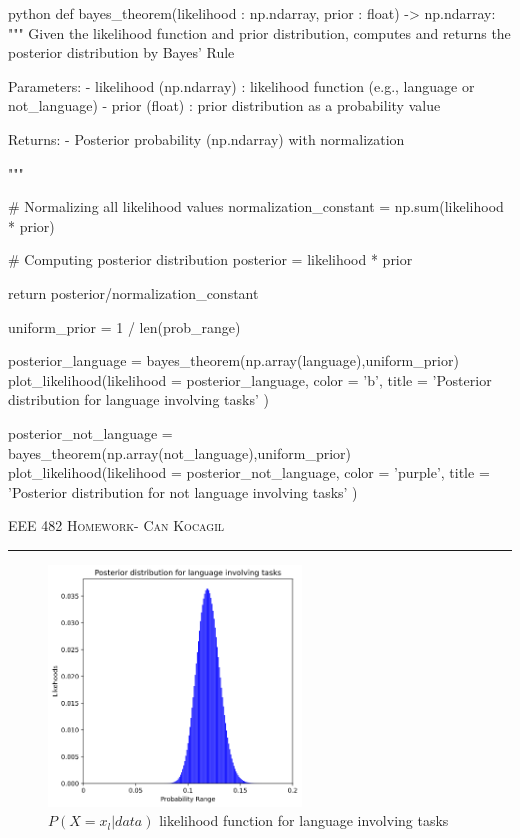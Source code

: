 \documentclass[12pt]{amsart}
\begin{document}
 \begin{mintedbox}{python}
def bayes_theorem(likelihood : np.ndarray, prior : float) -> np.ndarray:
    """
    Given the likelihood function and prior distribution,
    computes and returns the posterior distribution by Bayes' Rule

        Parameters:
            - likelihood (np.ndarray) : likelihood function (e.g., language or not_language)
            - prior (float)           : prior distribution as a probability value 

        Returns:
            - Posterior probability (np.ndarray) with normalization

    """

    # Normalizing all likelihood values
    normalization_constant = np.sum(likelihood * prior)
    
    # Computing posterior distribution    
    posterior = likelihood * prior 

    return posterior/normalization_constant

uniform_prior = 1 / len(prob_range)

posterior_language = bayes_theorem(np.array(language),uniform_prior)
plot_likelihood(likelihood = posterior_language,
                color = 'b',
                title = 'Posterior distribution for language involving tasks'
                )

posterior_not_language = bayes_theorem(np.array(not_language),uniform_prior)
plot_likelihood(likelihood = posterior_not_language,
                color = 'purple',
                title = 'Posterior distribution for not language involving tasks'
                )


\end{mintedbox}


\newpage
{\scshape EEE 482} \hfill {\scshape \large  Homework-\relax} \hfill {\scshape Can Kocagil}
\smallskip
\hrule

 \begin{figure}[h]
    \centering
    \includegraphics[width = 0.6\textwidth]{images/3.png}
    \caption{$P(X=x_l|data)$ likelihood function for language involving tasks }
\end{figure}
\end{document}
